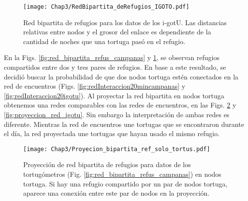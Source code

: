 \begin{figure}[ht]
    \begin{center}
        \texttt{[image: Chap3/RedBipartita\_deRefugios\_IGOTO.pdf]}
        \caption[Red bipartita de refugios para los datos de los i-gotU.]{Red bipartita de refugios para los datos de los i-gotU. Las distancias relativas entre nodos y el grosor del enlace es dependiente de la cantidad de noches que una  tortuga pasó en el refugio. }
        \label{fig:red_bipartita_refus_igotu}
       
        \end{center}
\end{figure}
En la Figs. \ref{fig:red_bipartita_refus_campanas} y \ref{fig:red_bipartita_refus_igotu}, se observan refugios compartidos entre dos y tres pares de refugios.  En base a este resultado, se decidió buscar la probabilidad de que dos nodos tortuga estén conectados en la red de encuentros (Figs. \ref{fig:redInteraccion20mincampanas} y \ref{fig:redInteraccion20igotu}). Al proyectar la red bipartita en nodos tortuga obtenemos una redes comparables con las redes de encuentros, en las Figs. \ref{fig:proyeccion_red_campanas} y \ref{fig:proyeccion_red_igotu}. Sin embargo la interpretación de ambas redes es diferente. Mientras la red de encuentros une tortugas que se encontraron durante el día, la red proyectada une tortugas que hayan usado el mismo refugio.
 
 
\begin{figure}[ht]
    \begin{center}
        \texttt{[image: Chap3/Proyecion\_bipartita\_ref\_solo\_tortus.pdf]}
        \caption[Proyección  de red bipartita de refugios para datos de los tortugómetros en nodos tortuga.]{Proyección  de red bipartita de refugios para datos de los tortugómetros (Fig. \ref{fig:red_bipartita_refus_campanas}) en nodos tortuga. Si hay una refugio compartido por un par de nodos tortuga, aparece una conexión entre este par de nodos en la proyección. }
        \label{fig:proyeccion_red_campanas}
       
        \end{center}
\end{figure}
 

